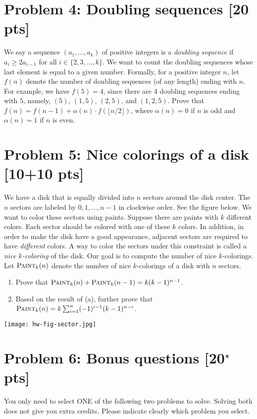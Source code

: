 \documentclass[11pt,twoside]{article}
\newcommand{\problem}[1]{\section*{Problem #1}}
\begin{document}
\problem{4: Doubling sequences [20 pts]} 
We say a sequence $(a_1,\dots,a_k)$ of positive integers is a \textit{doubling sequence} if $a_i \geq 2a_{i-1}$ for all $i \in \{2,3,\dots,k\}$.
We want to count the doubling sequences whose last element is equal to a given number.
Formally, for a positive integer $n$, let $f(n)$ denote the number of doubling sequences (of any length) ending with $n$.
For example, we have $f(5) = 4$, since there are $4$ doubling sequences ending with $5$, namely, $(5)$, $(1,5)$, $(2,5)$, and $(1,2,5)$.
Prove that $f(n) = f(n-1) + \alpha(n) \cdot f(\lfloor n/2 \rfloor)$, where $\alpha(n) = 0$ if $n$ is odd and $\alpha(n) = 1$ if $n$ is even.

\problem{5: Nice colorings of a disk [10+10 pts]} 
We have a disk that is equally divided into $n$ sectors around the disk center.
The $n$ sectors are labeled by $0,1,\dots,n-1$ in clockwise order.
See the figure below.
We want to color these sectors using paints.
Suppose there are paints with $k$ different colors.
Each sector should be colored with one of these $k$ colors.
In addition, in order to make the disk have a good appearance, adjacent sectors are required to have \textit{different} colors.
A way to color the sectors under this constraint is called a \textit{nice $k$-coloring} of the disk.
Our goal is to compute the number of nice $k$-colorings.
Let $\textsc{Paint}_k(n)$ denote the number of nice $k$-colorings of a disk with $n$ sectors.
\begin{enumerate}
    \item Prove that $\textsc{Paint}_k(n) + \textsc{Paint}_k(n-1) = k(k-1)^{n-1}$.
    \item Based on the result of (a), further prove that $\textsc{Paint}_k(n) = k \sum_{i=1}^{n} (-1)^{i-1} (k-1)^{n-i}$.
\end{enumerate}

\begin{center}
    \texttt{[image: hw-fig-sector.jpg]}
\end{center}

\problem{6: Bonus questions [20$^\star$ pts]}

{\color{red} You only need to select ONE of the following two problems to solve.
Solving both does not give you extra credits.
Please indicate clearly which problem you select.}
\end{document}
